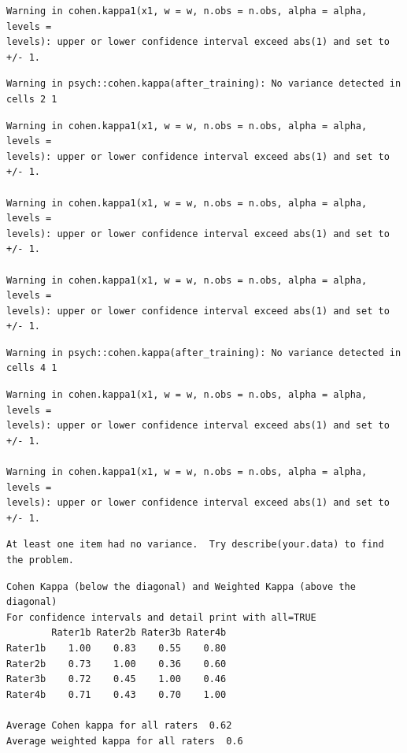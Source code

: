 \documentclass[
  english,
]{book}
\begin{document}
\begin{verbatim}
Warning in cohen.kappa1(x1, w = w, n.obs = n.obs, alpha = alpha, levels =
levels): upper or lower confidence interval exceed abs(1) and set to +/- 1.
\end{verbatim}

\begin{verbatim}
Warning in psych::cohen.kappa(after_training): No variance detected in cells 2 1
\end{verbatim}

\begin{verbatim}
Warning in cohen.kappa1(x1, w = w, n.obs = n.obs, alpha = alpha, levels =
levels): upper or lower confidence interval exceed abs(1) and set to +/- 1.

Warning in cohen.kappa1(x1, w = w, n.obs = n.obs, alpha = alpha, levels =
levels): upper or lower confidence interval exceed abs(1) and set to +/- 1.

Warning in cohen.kappa1(x1, w = w, n.obs = n.obs, alpha = alpha, levels =
levels): upper or lower confidence interval exceed abs(1) and set to +/- 1.
\end{verbatim}

\begin{verbatim}
Warning in psych::cohen.kappa(after_training): No variance detected in cells 4 1
\end{verbatim}

\begin{verbatim}
Warning in cohen.kappa1(x1, w = w, n.obs = n.obs, alpha = alpha, levels =
levels): upper or lower confidence interval exceed abs(1) and set to +/- 1.

Warning in cohen.kappa1(x1, w = w, n.obs = n.obs, alpha = alpha, levels =
levels): upper or lower confidence interval exceed abs(1) and set to +/- 1.
\end{verbatim}

\begin{verbatim}
At least one item had no variance.  Try describe(your.data) to find the problem.
\end{verbatim}

\begin{verbatim}
Cohen Kappa (below the diagonal) and Weighted Kappa (above the diagonal) 
For confidence intervals and detail print with all=TRUE
        Rater1b Rater2b Rater3b Rater4b
Rater1b    1.00    0.83    0.55    0.80
Rater2b    0.73    1.00    0.36    0.60
Rater3b    0.72    0.45    1.00    0.46
Rater4b    0.71    0.43    0.70    1.00

Average Cohen kappa for all raters  0.62
Average weighted kappa for all raters  0.6
\end{verbatim}
\end{document}
